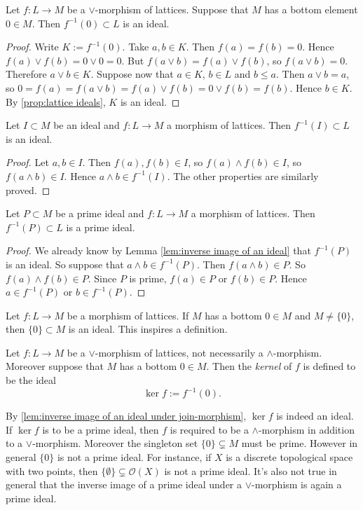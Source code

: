 \begin{lemma}
\label{lem:inverse image of an ideal under join-morphism}
Let $f : L \to M$ be a $\vee$-morphism of lattices. Suppose that $M$ has a bottom element $0 \in M$. Then $f^{-1}(0) \subset L$ is an ideal.
\end{lemma}
\begin{proof}
Write $K := f^{-1}(0)$. Take $a,b \in K$. Then $f(a) = f(b) = 0$. Hence $f(a) \vee f(b) = 0 \vee 0 = 0$. But $f(a \vee b) = f(a) \vee f(b)$, so $f(a \vee b) = 0$. Therefore $a \vee b \in K$. Suppose now that $a \in K$, $b \in L$ and $b \leq a$. Then $a \vee b = a$, so $0 = f(a) = f(a \vee b) = f(a) \vee f(b) = 0 \vee f(b) = f(b)$. Hence $b \in K$. By \cref{prop:lattice ideals}, $K$ is an ideal.
\end{proof}

\begin{lemma}
\label{lem:inverse image of an ideal}
Let $I \subset M$ be an ideal and $f : L \to M$ a morphism of lattices. Then $f^{-1}(I) \subset L$ is an ideal.
\end{lemma}
\begin{proof}
Let $a,b \in I$. Then $f(a), f(b) \in I$, so $f(a) \wedge f(b) \in I$, so $f(a \wedge b) \in I$. Hence $a \wedge b \in f^{-1}(I)$. The other properties are similarly proved.
\end{proof}

\begin{lemma}
\label{lem:inverse image of a prime ideal}
Let $P \subset M$ be a prime ideal and $f : L \to M$ a morphism of lattices. Then $f^{-1}(P) \subset L$ is a prime ideal.
\end{lemma}
\begin{proof}
We already know by Lemma \ref{lem:inverse image of an ideal} that $f^{-1}(P)$ is an ideal. So suppose that $a \wedge b \in f^{-1}(P)$. Then $f(a \wedge b) \in P$. So $f(a) \wedge f(b) \in P$. Since $P$ is prime, $f(a) \in P$ or $f(b) \in P$. Hence $a \in f^{-1}(P)$ or $b \in f^{-1}(P)$.
\end{proof}
Let $f : L \to M$ be a morphism of lattices. If $M$ has a bottom $0 \in M$ and $M \neq \{0\}$, then $\{0\} \subset M$ is an ideal. This inspires a definition.
\begin{definition}
Let $f : L \to M$ be a $\vee$-morphism of lattices, not necessarily a $\wedge$-morphism. Moreover suppose that $M$ has a bottom $0 \in M$. Then the \emph{kernel} of $f$ is defined to be the ideal
\[ \ker f := f^{-1}(0). \]
\end{definition}
By \cref{lem:inverse image of an ideal under join-morphism}, $\ker f$ is indeed an ideal.
If $\ker f$ is to be a prime ideal, then $f$ is required to be a $\wedge$-morphism in addition to a $\vee$-morphism.
Moreover the singleton set $\{0\} \subsetneq M$ must be prime. However in general $\{0\}$ is not a prime ideal.
For instance, if $X$ is a discrete topological space with two points, then $\{\emptyset\} \subsetneq \mathcal{O}(X)$ is not a prime ideal.
It's also not true in general that the inverse image of a prime ideal under a $\vee$-morphism is again a prime ideal.

